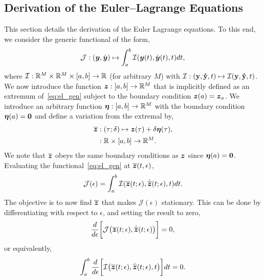 \documentclass[3p,computermodern,10pt]{elsarticle}
\begin{document}
\begin{appendices}
\section{Derivation of the Euler--Lagrange Equations}\label{appendix:eulerlagrange}
This section details the derivation of the Euler Lagrange equations. To this end, we consider the generic functional of the form,
\begin{equation}\label{eq:el_gen}
\mathcal{J}: (\boldsymbol y,\dot{\boldsymbol y}) \mapsto  \int_a^b \mathcal{I}(\boldsymbol y(t),\dot{\boldsymbol y}(t),t)  dt,
\end{equation}
where $\mathcal{I}: \mathbb{R}^{M} \times \mathbb{R}^{M} \times[a,b] \rightarrow  \mathbb{R}^{}$ (for arbitrary $M$) with $\mathcal{I}: (\mathbf{y},\mathbf{\dot{y}},t) \mapsto \mathcal{I}(\mathbf{y},\mathbf{\dot{y}},t)$.%
 We now introduce the function $\boldsymbol z: [a,b] \rightarrow \mathbb{R}^{M}$ that is implicitly defined as an extremum of~\eqref{eq:el_gen} subject to the boundary condition $\boldsymbol z(a) = \boldsymbol z_a$. %
We introduce an arbitrary function $\boldsymbol \eta : [a,b] \rightarrow \mathbb{R}^{M}$ with the boundary condition $\boldsymbol \eta(a) = \boldsymbol 0$ and define a variation from the extremal by,
\begin{align*}
\overline{\boldsymbol z}  &: (\tau;\delta) \mapsto \boldsymbol z(\tau) + \delta \boldsymbol \eta(\tau),\\
&: \mathbb{R}^{} \times [a,b] \rightarrow \mathbb{R}^{M}.
\end{align*}
We note that $\overline{\boldsymbol z}$ obeys the same boundary conditions as $\boldsymbol z$ since $\boldsymbol \eta(a) = \boldsymbol 0$.
Evaluating the functional~\eqref{eq:el_gen} at $\overline{\boldsymbol z}(t,\epsilon)$,
$$
\mathcal{J}(\epsilon) = \int_a^b \mathcal{I}(\overline{\boldsymbol z}(t;\epsilon),\dot{\overline{\boldsymbol z}}(t;\epsilon) ,t)  dt.
$$
The objective is to now find $\overline{\boldsymbol z}$ that makes $\mathcal{J}(\epsilon)$ stationary. This can be done by differentiating with respect to $\epsilon$, and setting the result to zero,%
$$
\frac{d}{d\epsilon} \bigg[ \mathcal{J}\big(\overline{\boldsymbol z}(t;\epsilon),\dot{\overline{\boldsymbol z}}(t;\epsilon) \big)\bigg] =  0,
$$
or equivalently,
$$
\int_a^b \frac{d}{d\epsilon} \bigg[ \mathcal{I} \big(\overline{\boldsymbol z}(t;\epsilon),\dot{\overline{\boldsymbol z}}(t;\epsilon),t \big)\bigg] dt=  0.
$$

\end{appendices}
\end{document}
